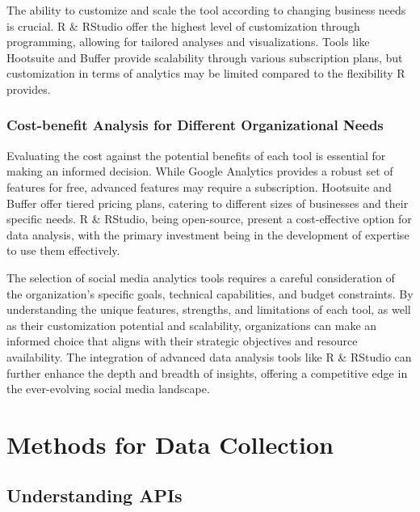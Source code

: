 \documentclass[
]{book}
\begin{document}
The ability to customize and scale the tool according to changing business needs is crucial. R \& RStudio offer the highest level of customization through programming, allowing for tailored analyses and visualizations. Tools like Hootsuite and Buffer provide scalability through various subscription plans, but customization in terms of analytics may be limited compared to the flexibility R provides.

\hypertarget{cost-benefit-analysis-for-different-organizational-needs}{%
\subsubsection*{Cost-benefit Analysis for Different Organizational Needs}\label{cost-benefit-analysis-for-different-organizational-needs}}

Evaluating the cost against the potential benefits of each tool is essential for making an informed decision. While Google Analytics provides a robust set of features for free, advanced features may require a subscription. Hootsuite and Buffer offer tiered pricing plans, catering to different sizes of businesses and their specific needs. R \& RStudio, being open-source, present a cost-effective option for data analysis, with the primary investment being in the development of expertise to use them effectively.

The selection of social media analytics tools requires a careful consideration of the organization's specific goals, technical capabilities, and budget constraints. By understanding the unique features, strengths, and limitations of each tool, as well as their customization potential and scalability, organizations can make an informed choice that aligns with their strategic objectives and resource availability. The integration of advanced data analysis tools like R \& RStudio can further enhance the depth and breadth of insights, offering a competitive edge in the ever-evolving social media landscape.

\hypertarget{methods-for-data-collection}{%
\section*{Methods for Data Collection}\label{methods-for-data-collection}}

\hypertarget{understanding-apis}{%
\subsection*{Understanding APIs}\label{understanding-apis}}
\end{document}
